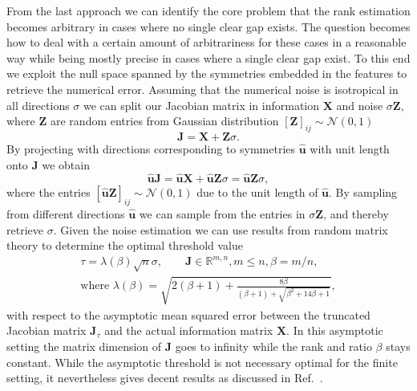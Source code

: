 From the last approach we can identify the core problem that the rank estimation becomes arbitrary in cases where no single clear gap exists.
The question becomes how to deal with a certain amount of arbitrariness for these cases in a reasonable way while being mostly precise in cases where a single clear gap exist.
To this end we exploit the null space spanned by the symmetries embedded in the features to retrieve the numerical error.
Assuming that the numerical noise is isotropical in all directions $\sigma$ we can split our Jacobian matrix in information $\mathbf{X}$ and noise $\sigma \mathbf{Z}$, where $\mathbf{Z}$ are random entries from Gaussian distribution $[\mathbf{Z}]_{ij}\sim\mathcal{N}(0, 1)$
\begin{equation}
    \mathbf{J} = \mathbf{X} + \mathbf{Z}\sigma.
\end{equation}
By projecting with directions corresponding to symmetries $\hat{\mathbf{u}}$ with unit length onto $\mathbf{J}$ we obtain
\begin{equation}
    \hat{\mathbf{u}}\mathbf{J} = \hat{\mathbf{u}}\mathbf{X} + \hat{\mathbf{u}}\mathbf{Z}\sigma = \hat{\mathbf{u}}\mathbf{Z}\sigma,
    \label{eq:sampling-numerical-noise}
\end{equation}
where the entries $[\hat{\mathbf{u}}\mathbf{Z}]_{ij}\sim\mathcal{N}(0,1)$ due to the unit length of $\hat{\mathbf{u}}$.
By sampling from different directions $\hat{\mathbf{u}}$ we can sample from the entries in $\sigma\mathbf{Z}$, and thereby retrieve $\sigma$.
Given the noise estimation we can use results from random matrix theory\cite{gavish2014optimal} to determine the optimal threshold value%
\begin{multline}
    \tau = \lambda(\beta)\sqrt{n}\sigma,\qquad \mathbf{J}\in\mathbb{R}^{m,n}, m\leq n, \beta = m/n,\\
    \textrm{where }\lambda(\beta) = \sqrt{2(\beta+1)+\frac{8\beta}{(\beta+1)+\sqrt{\beta^2+14\beta+1}}},
    \label{eq:threshold-random-matrix-theory}
\end{multline}
with respect to the asymptotic mean squared error between the truncated Jacobian matrix $\mathbf{J}_{\tau}$ and the actual information matrix $\mathbf{X}$.
In this asymptotic setting the matrix dimension of $\mathbf{J}$ goes to infinity while the rank and ratio $\beta$ stays constant\cite{shabalin2013reconstruction}.
While the asymptotic threshold is not necessary optimal for the finite setting, it nevertheless gives decent results as discussed in Ref.~\cite{gavish2014optimal}.
